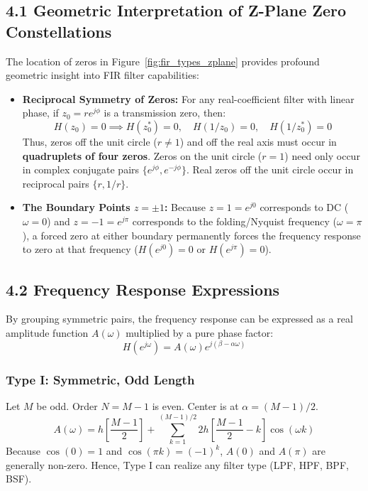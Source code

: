 \documentclass[11pt,a4paper]{article}
\begin{document}
\subsection{4.1 Geometric Interpretation of Z-Plane Zero Constellations}
The location of zeros in Figure~\ref{fig:fir_types_zplane} provides profound geometric insight into FIR filter capabilities:
\begin{itemize}
    \item \textbf{Reciprocal Symmetry of Zeros:} For any real-coefficient filter with linear phase, if $z_0 = r e^{j\phi}$ is a transmission zero, then:
    \begin{equation}
    H(z_0) = 0 \implies H(z_0^*) = 0, \quad H(1/z_0) = 0, \quad H(1/z_0^*) = 0
    \end{equation}
    Thus, zeros off the unit circle ($r \neq 1$) and off the real axis must occur in \textbf{quadruplets of four zeros}. Zeros on the unit circle ($r = 1$) need only occur in complex conjugate pairs $\{e^{j\phi}, e^{-j\phi}\}$. Real zeros off the unit circle occur in reciprocal pairs $\{r, 1/r\}$.
    \item \textbf{The Boundary Points $z = \pm 1$:} Because $z = 1 = e^{j 0}$ corresponds to DC ($\omega = 0$) and $z = -1 = e^{j \pi}$ corresponds to the folding/Nyquist frequency ($\omega = \pi$), a forced zero at either boundary permanently forces the frequency response to zero at that frequency ($H(e^{j 0}) = 0$ or $H(e^{j \pi}) = 0$).
\end{itemize}

\subsection{4.2 Frequency Response Expressions}
By grouping symmetric pairs, the frequency response can be expressed as a real amplitude function $A(\omega)$ multiplied by a pure phase factor:
\begin{equation}
H(e^{j\omega}) = A(\omega) e^{j(\beta - \alpha\omega)}
\end{equation}

\subsubsection{Type I: Symmetric, Odd Length}
Let $M$ be odd. Order $N = M-1$ is even. Center is at $\alpha = (M-1)/2$.
\begin{equation}
A(\omega) = h\left[\frac{M-1}{2}\right] + \sum_{k=1}^{(M-1)/2} 2 h\left[\frac{M-1}{2} - k\right] \cos(\omega k)
\end{equation}
Because $\cos(0) = 1$ and $\cos(\pi k) = (-1)^k$, $A(0)$ and $A(\pi)$ are generally non-zero. Hence, Type I can realize any filter type (LPF, HPF, BPF, BSF).
\end{document}
